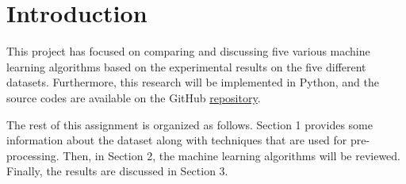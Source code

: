 \documentclass[12pt]{article}
\begin{document}



\tableofcontents
\pagebreak
\newpage
\vspace{2cm}

\section*{Introduction}
\vspace{2cm}
This project has focused on comparing and discussing five various machine learning algorithms based on the experimental results on the five different datasets. Furthermore, this research will be implemented in Python, and the source codes are available on the GitHub \href{https://github.com/SKazemii/CS6735}{ repository}. 

The rest of this assignment is organized as follows. Section 1 provides some information about the dataset along with techniques that are used for pre-processing. Then, in Section 2, the machine learning algorithms will be reviewed. Finally, the results are discussed in Section 3.
\newpage
\end{document}
